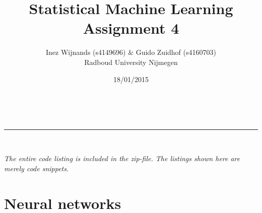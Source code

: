 \documentclass[a4paper,10pt]{article}
\makeatletter
\numberwithin{equation}{section} %
\numberwithin{figure}{section} %
\numberwithin{table}{section} %
\newcommand{\linia}{\rule{\linewidth}{0.5pt}}
\theoremstyle{mytheor}
\renewcommand{\maketitle}{
\begin{center}
\vspace{2ex}
{\huge \textsc{\@title}}
\vspace{1ex}
\\
\linia\\
\@author  \@date
\vspace{4ex}
\end{center}
}
\makeatother
\begin{document}
\title{Statistical Machine Learning \\ Assignment 4}

\author{Inez Wijnands (s4149696) \& Guido Zuidhof (s4160703)\\ Radboud University Nijmegen\\}

\date{18/01/2015}

\maketitle

\noindent \textit{The entire code listing is included in the zip-file. The listings shown here are merely code snippets}.\vspace{-0.5cm}
\section{Neural networks}
\end{document}
